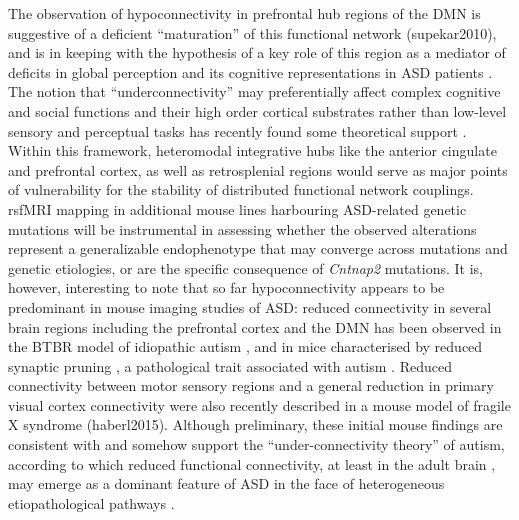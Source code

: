 The observation of hypoconnectivity in prefrontal hub regions of the DMN
\parencite{liska2015} is suggestive of a deficient “maturation” of this
functional network (supekar2010), and is in keeping with the hypothesis of a key
role of this region as a mediator of deficits in global perception and its
cognitive representations in ASD patients \parencite{martinez-sanchis2014}. The
notion that “underconnectivity” may preferentially affect complex cognitive and
social functions and their high order cortical substrates rather than low-level
sensory and perceptual tasks has recently found some theoretical support
\parencite{kana2011}.  Within this framework, heteromodal integrative hubs like
the anterior cingulate and prefrontal cortex, as well as retrosplenial regions
would serve as major points of vulnerability for the stability of distributed
functional network couplings. rsfMRI mapping in additional mouse lines
harbouring ASD-related genetic mutations will be instrumental in assessing
whether the observed alterations represent a generalizable endophenotype that
may converge across mutations and genetic etiologies, or are the specific
consequence of \textit{Cntnap2} mutations. It is, however, interesting to note that so
far hypoconnectivity appears to be predominant in mouse imaging studies of ASD:
reduced connectivity in several brain regions including the prefrontal cortex
and the DMN has been observed in the BTBR model of idiopathic autism
\parencite{sforazzini2016}, and in mice characterised by reduced synaptic
pruning \parencite{zhan2014}, a pathological trait associated with autism
\parencite{tang2014}. Reduced connectivity between motor sensory regions and a
general reduction in primary visual cortex connectivity were also recently
described in a mouse model of fragile X syndrome (haberl2015). Although
preliminary, these initial mouse findings are consistent with and somehow
support the “under-connectivity theory” of autism, according to which reduced
functional connectivity, at least in the adult brain \parencite{uddin2013}, may
emerge as a dominant feature of ASD in the face of heterogeneous
etiopathological pathways \parencite{dimartino2014a, uddin2013}.

